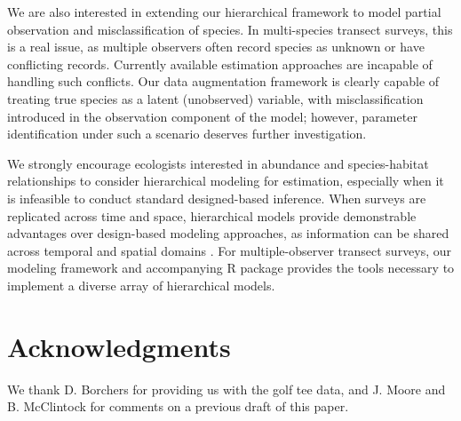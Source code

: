 \documentclass[10pt]{article}
\begin{document}
We are also interested in extending our hierarchical framework to model partial observation and misclassification of species.  In multi-species transect surveys, this is a real issue, as multiple observers often record species as unknown or have conflicting records.  Currently available estimation approaches are incapable of handling such conflicts.  Our data augmentation framework is clearly capable of treating true species as a latent (unobserved) variable, with misclassification introduced in the observation component of the model; however, parameter identification under such a scenario deserves further investigation.

We strongly encourage ecologists interested in abundance and species-habitat relationships to consider hierarchical modeling for estimation, especially when it is infeasible to conduct standard designed-based inference.  When surveys are replicated across time and space, hierarchical models provide demonstrable advantages over design-based modeling approaches, as information can be shared across temporal and spatial domains \cite{RoyleEtAl2007,MooreBarlow2011}.  For multiple-observer transect surveys, our modeling framework and accompanying R package provides the tools necessary to implement a diverse array of hierarchical models.

\section*{Acknowledgments}
We thank D. Borchers for providing us with the golf tee data, and J. Moore and B. McClintock for comments on a previous draft of this paper.


\clearpage

\end{document}
